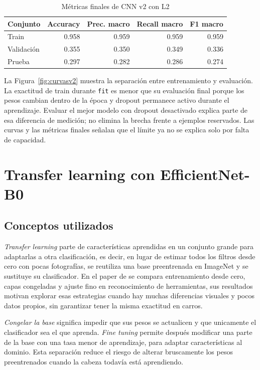 \documentclass[conference]{IEEEtran}
\begin{document}
\begin{table}[!htbp]
\caption{Métricas finales de CNN v2 con L2}
\label{tab:metricascnnv2}
\centering
\scriptsize
\setlength{\tabcolsep}{3pt}
\begin{tabular}{lrrrr}
\toprule
Conjunto & Accuracy & Prec. macro & Recall macro & F1 macro \\
\midrule
Train & 0.958 & 0.959 & 0.959 & 0.959 \\
Validación & 0.355 & 0.350 & 0.349 & 0.336 \\
Prueba & 0.297 & 0.282 & 0.286 & 0.274 \\
\bottomrule
\end{tabular}
\end{table}


La Figura~\ref{fig:curvasv2} muestra la separación entre entrenamiento y evaluación. La exactitud de train durante \texttt{fit} es menor que su evaluación final porque los pesos cambian dentro de la época y dropout permanece activo durante el aprendizaje. Evaluar el mejor modelo con dropout desactivado explica parte de esa diferencia de medición; no elimina la brecha frente a ejemplos reservados. Las curvas y las métricas finales señalan que el límite ya no se explica solo por falta de capacidad.

\FloatBarrier
\section{Transfer learning con EfficientNet-B0}

\subsection{Conceptos utilizados}

\textit{Transfer learning} parte de características aprendidas en un conjunto grande para adaptarlas a otra clasificación, es decir, en lugar de estimar todos los filtros desde cero con pocas fotografías, se reutiliza una base preentrenada en ImageNet y se sustituye su clasificador. En el paper de \citet{bilal2025} se compara entrenamiento desde cero, capas congeladas y ajuste fino en reconocimiento de herramientas, sus resultados motivan explorar esas estrategias cuando hay muchas diferencias visuales y pocos datos propios, sin garantizar tener la misma exactitud en carros.

\textit{Congelar la base} significa impedir que sus pesos se actualicen y que unicamente el clasificador sea el que aprenda. \textit{Fine tuning} permite después modificar una parte de la base con una tasa menor de aprendizaje, para adaptar características al dominio. Esta separación reduce el riesgo de alterar bruscamente los pesos preentrenados cuando la cabeza todavía está aprendiendo.
\end{document}
